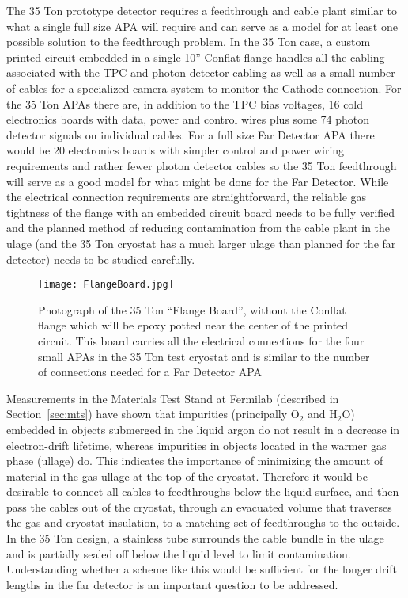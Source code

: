 The 35 Ton prototype detector requires a feedthrough and cable plant similar to what a single full size APA
will require and can serve as a model for at least one possible solution to the feedthrough problem.
In the 35 Ton case, a custom printed circuit embedded in a single 10'' Conflat flange handles all the cabling
associated with the TPC and photon detector cabling as well as a small number of cables for a specialized
camera system to monitor the Cathode connection.
For the 35 Ton APAs there are, in addition to the TPC bias voltages, 16 cold electronics boards with data,
power and control wires plus some 74 photon detector signals on individual cables.
For a full size Far Detector APA there would be 20 electronics boards with simpler control and power wiring
requirements and rather fewer photon detector cables so the 35 Ton feedthrough will serve as a good model
for what might be done for the Far Detector.
While the electrical connection requirements are straightforward,
the reliable gas tightness of the flange with an embedded circuit board needs to be fully verified
and the planned method of reducing contamination from the cable plant in the ulage
(and the 35 Ton cryostat has a much larger ulage than planned for the far detector) needs to be studied carefully.

\begin{figure}[htbp]
\centering
\texttt{[image: FlangeBoard.jpg]}
\caption{Photograph of the 35 Ton ``Flange Board'', without the Conflat flange which will be epoxy potted near
  the center of the printed circuit.
  This board carries all the electrical connections for the four small APAs in the 35 Ton
  test cryostat and is similar to the number of connections needed for a Far Detector APA
}
\label{fig:ce_feedthrough}
\end{figure}


Measurements in the Materials Test Stand at Fermilab (described in Section~\ref{sec:mts})
have shown that impurities (principally O$_2$ and H$_2$O) embedded in objects submerged in the liquid argon do not result
in a decrease in electron-drift lifetime, whereas impurities in objects located in the warmer gas phase (ullage) do.
This indicates the importance of minimizing the amount of material in the gas ullage at the top of the cryostat.
Therefore it would be desirable to connect all cables to feedthroughs below the liquid surface,
and then pass the cables out of the cryostat, through an evacuated volume that traverses the gas and cryostat insulation,
to a matching set of feedthroughs to the outside.
In the 35 Ton design, a stainless tube surrounds the cable bundle in the ulage and is partially sealed off below the
liquid level to limit contamination.
Understanding whether a scheme like this would be sufficient for the longer drift lengths in the far detector
is an important question to be addressed.

